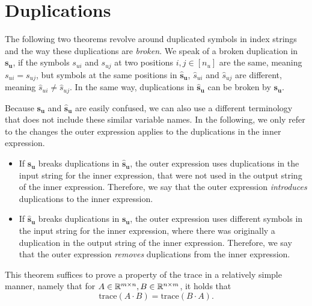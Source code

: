 \section{Duplications}

The following two theorems revolve around duplicated symbols in index strings and the way these duplications are \textit{broken}.
We speak of a broken duplication in $\bm{s_u}$, if the symbols $s_{ui}$ and $s_{uj}$ at two positions $i,j \in [n_u]$ are the same, meaning $s_{ui} = s_{uj}$,
but symbols at the same positions in $\bm{\hat{s}_u}$, $\hat{s}_{ui}$ and $\hat{s}_{uj}$ are different, meaning $\hat{s}_{ui} \neq \hat{s}_{uj}$.
In the same way, duplications in $\bm{\hat{s}_u}$ can be broken by $\bm{s_u}$.

Because $\bm{s_u}$ and $\bm{\hat{s}_u}$ are easily confused, we can also use a different terminology that does not include these similar variable names.
In the following, we only refer to the changes the outer expression applies to the duplications in the inner expression.
\begin{itemize}
    \item If $\bm{s_u}$ breaks duplications in $\bm{\hat{s}_u}$,
          the outer expression uses duplications in the input string for the inner expression, that were not used in the output string of the inner expression.
          Therefore, we say that the outer expression \textit{introduces} duplications to the inner expression.
    \item If $\bm{\hat{s}_u}$ breaks duplications in $\bm{s_u}$,
          the outer expression uses different symbols in the input string for the inner expression, where there was originally a duplication in the output string of the inner expression.
          Therefore, we say that the outer expression \textit{removes} duplications from the inner expression.
\end{itemize}



This theorem suffices to prove a property of the trace in a relatively simple manner, namely that for $A \in \mathbb{R}^{m \times n}, B \in \mathbb{R}^{n \times m}$,
it holds that
$$\text{trace}(A \cdot B) = \text{trace}(B \cdot A).$$

